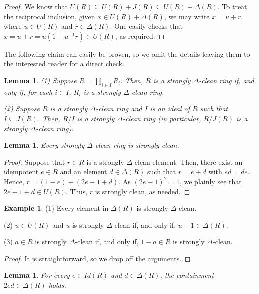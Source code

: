 \documentclass[12pt]{amsart}
\newtheorem{lemma}[theorem]{Lemma}
\theoremstyle{definition}
\newtheorem{example}[theorem]{Example}
\begin{document}
\begin{proof}
We know that \(U(R) \subseteq U(R) + J(R) \subseteq U(R) + \Delta(R)\). To treat the reciprocal inclusion, given \(x \in U(R) + \Delta(R)\), we may write \(x = u+r\), where \(u \in U(R)\) and \(r \in \Delta(R)\). One easily checks that \(x = u + r = u(1+u^{-1}r) \in U(R) \), as required.
\end{proof}

The following claim can easily be proven, so we omit the details leaving them to the interested reader for a direct check.

\begin{lemma}\label{lemma 0}
(1) Suppose \( R = \prod_{i \in I} R_i \). Then, \( R \) is a strongly $\Delta$-clean ring if, and only if, for each \( i \in I \), \( R_i \) is a strongly $\Delta$-clean ring.

(2) Suppose \( R \) is a strongly $\Delta$-clean ring and \( I \) is an ideal of \( R \) such that \( I \subseteq J(R) \). Then, \( R/I \) is a strongly $\Delta$-clean ring (in particular, $R/J(R)$ is a strongly $\Delta$-clean ring).
\end{lemma}

\begin{lemma}\label{1.5}
Every strongly $\Delta$-clean ring is strongly clean.	
\end{lemma}

\begin{proof}
Suppose that $r\in R$ is a strongly $\Delta$-clean element. Then, there exist an idempotent $e\in R$ and an element $d\in \Delta(R)$ such that $r=e+d$ with $ed=de$. Hence, $r=(1-e)+(2e-1+d)$. As $(2e-1)^2=1$, we plainly see that $2e-1+d\in U(R)$. Thus, $r$ is strongly clean, as needed.
\end{proof}

\begin{example}
(1) Every element in $\Delta(R)$ is strongly $\Delta$-clean.

(2) $u\in U(R)$ and $u$ is strongly $\Delta$-clean if, and only if, $u-1\in \Delta(R)$.

(3) $a\in R$ is strongly $\Delta$-clean if, and only if, $1-a\in R$ is strongly $\Delta$-clean.	
\end{example}

\begin{proof}
It is straightforward, so we drop off the arguments.
\end{proof}

\begin{lemma}\label{lemma 1}
For every \( e \in Id(R) \) and \( d \in \Delta(R) \), the containment \( 2ed \in \Delta(R) \) holds.
\end{lemma}
\end{document}
